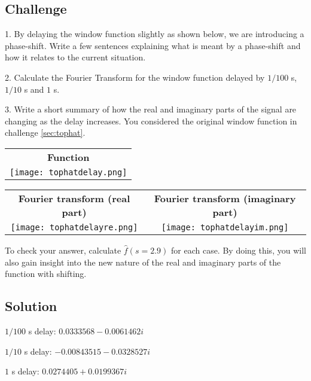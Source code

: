 \subsection*{Challenge}
1. By delaying the window function slightly as shown below, we are introducing a phase-shift. Write a few sentences explaining what is meant by a phase-shift and how it relates to the current situation.

2. Calculate the Fourier Transform for the window function delayed by $1/100$ s, $1/10$ s and $1$ s.

3. Write a short summary of how the real and imaginary parts of the signal are changing as the delay increases. You considered the original window function in challenge \ref{sec:tophat}.

\begin{tabular}{c}
    \textbf{Function} \\
    \texttt{[image: tophatdelay.png]}
\end{tabular}

\begin{tabular}{cc}
    \textbf{Fourier transform (real part)} & \textbf{Fourier transform (imaginary part)}\\
    \texttt{[image: tophatdelayre.png]} & \texttt{[image: tophatdelayim.png]}
\end{tabular}

To check your answer, calculate $\hat{f}(s=2.9)$ for each case. By doing this, you will also gain insight into the new nature of the real and imaginary parts of the function with shifting.

\subsection*{Solution}
$1/100$ s delay: $0.0333568 - 0.0061462i$

$1/10$ s delay: $-0.00843515 - 0.0328527i$

$1$ s delay: $0.0274405 + 0.0199367i$

\timebox







